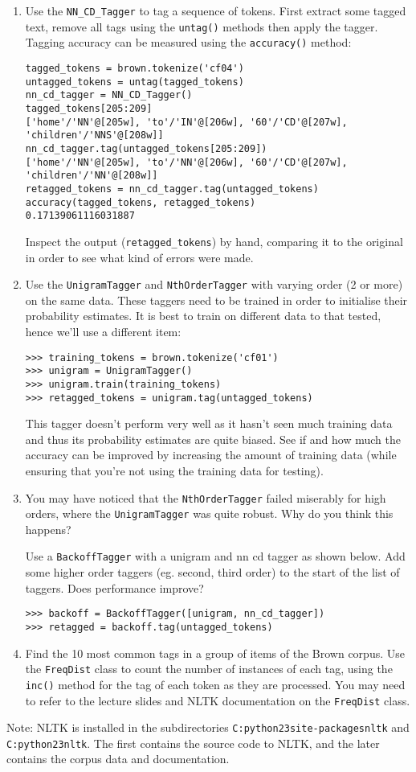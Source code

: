 \documentclass{worksheet}
\begin{document}
\begin{enumerate}
\item Use the \texttt{NN\_CD\_Tagger} to tag a sequence of tokens. First
extract some tagged text, remove all tags using the \texttt{untag()}
methods then apply the tagger. Tagging accuracy can be measured using
the \texttt{accuracy()} method:
\begin{verbatim}
tagged_tokens = brown.tokenize('cf04')
untagged_tokens = untag(tagged_tokens)
nn_cd_tagger = NN_CD_Tagger()
tagged_tokens[205:209]
['home'/'NN'@[205w], 'to'/'IN'@[206w], '60'/'CD'@[207w], 'children'/'NNS'@[208w]]
nn_cd_tagger.tag(untagged_tokens[205:209])
['home'/'NN'@[205w], 'to'/'NN'@[206w], '60'/'CD'@[207w], 'children'/'NN'@[208w]]
retagged_tokens = nn_cd_tagger.tag(untagged_tokens)
accuracy(tagged_tokens, retagged_tokens)
0.17139061116031887
\end{verbatim}
Inspect the output (\texttt{retagged\_tokens}) by hand, comparing it to
the original in order to see what kind of errors were made.

\item Use the \texttt{UnigramTagger} and \texttt{NthOrderTagger} with varying
order (2 or more) on the same data. These taggers need to be trained in
order to initialise their probability estimates. It is best to train on
different data to that tested, hence we'll use a different item:
\begin{verbatim}
>>> training_tokens = brown.tokenize('cf01') 
>>> unigram = UnigramTagger() 
>>> unigram.train(training_tokens) 
>>> retagged_tokens = unigram.tag(untagged_tokens)
\end{verbatim}
This tagger doesn't perform very well as it hasn't seen much training data
and thus its probability estimates are quite biased. See if and how much
the accuracy can be improved by increasing the amount of training data
(while ensuring that you're not using the training data for testing). 

\item You may have noticed that the \texttt{NthOrderTagger} failed miserably
for high orders, where the \texttt{UnigramTagger} was quite robust. Why do
you think this happens?

Use a \texttt{BackoffTagger} with a unigram and nn cd tagger as shown
below. Add some higher order taggers (eg. second, third order) to the
start of the list of taggers. Does performance improve?
\begin{verbatim}
>>> backoff = BackoffTagger([unigram, nn_cd_tagger])
>>> retagged = backoff.tag(untagged_tokens)
\end{verbatim}

\item Find the 10 most common tags in a group of items of the Brown corpus.
Use the \texttt{FreqDist} class to count the number of instances of each
tag, using the \texttt{inc()} method for the tag of each token as they are
processed. You may need to refer to the lecture slides and NLTK
documentation on the \texttt{FreqDist} class.

\end{enumerate}

Note: NLTK is installed in the subdirectories
\texttt{C:{\bs}python23{\bs}site-packages{\bs}nltk} and
\texttt{C:{\bs}python23{\bs}nltk}. The first contains the source code
to NLTK, and the later contains the corpus data and documentation.
\end{document}
